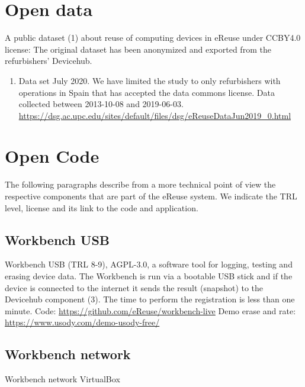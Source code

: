 \documentclass[
]{book}
\providecommand{\tightlist}{%
  \setlength{\itemsep}{0pt}\setlength{\parskip}{0pt}}
\begin{document}
\hypertarget{open-data}{%
\section{Open data}\label{open-data}}

A public dataset (1) about reuse of computing devices in eReuse under CCBY4.0 license: The original dataset has been anonymized and exported from the refurbishers' Devicehub.

\begin{enumerate}
\def\labelenumi{\arabic{enumi}.}
\tightlist
\item
  Data set July 2020. We have limited the study to only refurbishers with operations in Spain that has accepted the data commons license. Data collected between 2013-10-08 and 2019-06-03.
  \url{https://dsg.ac.upc.edu/sites/default/files/dsg/eReuseDataJun2019_0.html}
\end{enumerate}

\hypertarget{open-code}{%
\section{Open Code}\label{open-code}}

The following paragraphs describe from a more technical point of view the respective components that are part of the eReuse system. We indicate the TRL level, license and its link to the code and application.

\hypertarget{workbench-usb}{%
\subsection{Workbench USB}\label{workbench-usb}}

Workbench USB (TRL 8-9), AGPL-3.0, a software tool for logging, testing and erasing device data. The Workbench is run via a bootable USB stick and if the device is connected to the internet it sends the result (snapshot) to the Devicehub component (3). The time to perform the registration is less than one minute.
Code: \url{https://github.com/eReuse/workbench-live}
Demo erase and rate: \url{https://www.usody.com/demo-usody-free/}

\hypertarget{workbench-network}{%
\subsection{Workbench network}\label{workbench-network}}

Workbench network VirtualBox
\end{document}
